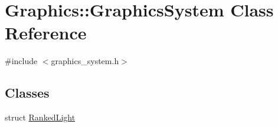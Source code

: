 \hypertarget{class_graphics_1_1_graphics_system}{}\section{Graphics\+:\+:Graphics\+System Class Reference}
\label{class_graphics_1_1_graphics_system}


{\ttfamily \#include $<$graphics\+\_\+system.\+h$>$}

\subsection*{Classes}
\begin{DoxyCompactItemize}
\item 
struct \hyperlink{struct_graphics_1_1_graphics_system_1_1_ranked_light}{Ranked\+Light}
\end{DoxyCompactItemize}
